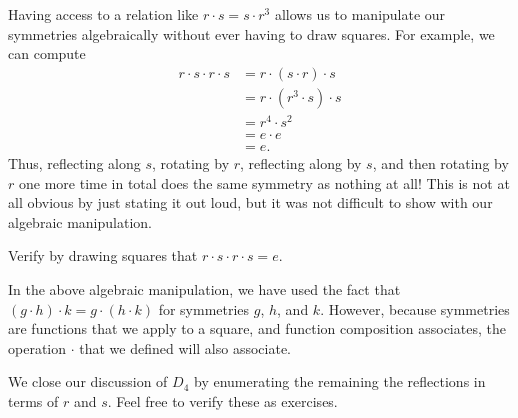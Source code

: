 \documentclass[../main.tex]{subfiles}
\begin{document}
Having access to a relation like $r\cdot s=s\cdot r^3$ allows us to manipulate our symmetries algebraically without ever having to draw squares. For example, we can compute
\begin{align*}
    r\cdot s\cdot r\cdot s &= r\cdot (s\cdot r)\cdot s \\
    &= r\cdot\left(r^3\cdot s\right)\cdot s \\
    &= r^4\cdot s^2 \\
    &= e\cdot e \\
    &= e.
\end{align*}
Thus, reflecting along $s$, rotating by $r$, reflecting along by $s$, and then rotating by $r$ one more time in total does the same symmetry as nothing at all! This is not at all obvious by just stating it out loud, but it was not difficult to show with our algebraic manipulation.
\begin{exe}
    Verify by drawing squares that $r\cdot s\cdot r\cdot s=e$.
\end{exe}
\begin{remark}
    In the above algebraic manipulation, we have used the fact that $(g\cdot h)\cdot k=g\cdot(h\cdot k)$ for symmetries $g$, $h$, and $k$. However, because symmetries are functions that we apply to a square, and function composition associates, the operation $\cdot$ that we defined will also associate.
\end{remark}
We close our discussion of $D_4$ by enumerating the remaining the reflections in terms of $r$ and $s$. Feel free to verify these as exercises.
\end{document}
